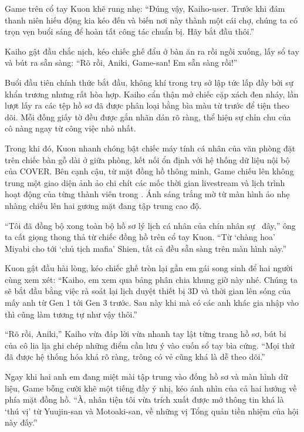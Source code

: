 \documentclass[../main.tex]{subfiles}
\begin{document}
Game trên cổ tay Kuon khẽ rung nhẹ:  ``Đúng vậy, Kaiho-user. Trước khi đám thanh niên hiếu động kia kéo đến và biến nơi này thành một cái chợ, chúng ta có trọn vẹn buổi sáng để hoàn tất công tác chuẩn bị. Hãy bắt đầu thôi.''

Kaiho gật đầu chắc nịch, kéo chiếc ghế đẩu ở bàn ăn ra rồi ngồi xuống, lấy sổ tay và bút ra sẵn sàng: ``Rõ rồi, Aniki, Game-san! Em sẵn sàng rồi!''

\ct

Buổi đầu tiên chính thức bắt đầu, không khí trong trụ sở lập tức lấp đầy bởi sự khẩn trương nhưng rất hòa hợp. Kaiho cẩn thận mở chiếc cặp xách đen nháy, lần lượt lấy ra các tệp hồ sơ đã được phân loại bằng bìa màu từ trước để tiện theo dõi. Mỗi đống giấy tờ đều được gắn nhãn dán rõ ràng, thể hiện sự chỉn chu của cô nàng ngay từ công việc nhỏ nhất.

Trong khi đó, Kuon nhanh chóng bật chiếc máy tính cá nhân của văn phòng đặt trên chiếc bàn gỗ dài ở giữa phòng, kết nối ổn định với hệ thống dữ liệu nội bộ của COVER. Bên cạnh cậu, từ mặt đồng hồ thông minh, Game chiếu lên không trung một giao diện ảnh ảo chi chít các mốc thời gian livestream và lịch trình hoạt động của từng thành viên trong \hls. Ánh sáng trắng mờ từ màn hình ảo nhẹ nhàng chiếu lên hai gương mặt đang tập trung cao độ.

``Tôi đã đồng bộ xong toàn bộ hồ sơ lý lịch cá nhân của chín nhân sự \hls\ đây,'' ông ta cất giọng thong thả từ chiếc đồng hồ trên cổ tay Kuon. ``Từ `chàng hoa' Miyabi cho tới `chủ tịch mafia' Shien, tất cả đều sẵn sàng trên màn hình này.''

Kuon gật đầu hài lòng, kéo chiếc ghế tròn lại gần em gái song sinh để hai người cùng xem xét: ``Kaiho, em xem qua bảng phân chia khung giờ này nhé. Chúng ta sẽ bắt đầu bằng việc rà soát lại lịch duyệt thiết bị 3D và thời gian lên sóng của mấy anh từ Gen 1 tới Gen 3 trước. Sau này khi mà có các anh khác gia nhập vào thì cũng làm tương tự như vậy thôi.''

``Rõ rồi, Aniki,'' Kaiho vừa đáp lời vừa nhanh tay lật từng trang hồ sơ, bút bi của cô lia lịa ghi chép những điểm cần lưu ý vào cuốn sổ tay bìa cứng. ``Mọi thứ đã được hệ thống hóa khá rõ ràng, trông có vẻ cũng khá là dễ theo dõi.''

Ngay khi hai anh em đang miệt mài tập trung vào đống hồ sơ và màn hình dữ liệu, Game bỗng cười khẽ một tiếng đầy ý nhị, kéo ánh nhìn của cả hai hướng về phía mặt đồng hồ. ``À, nhân tiện tôi vừa trích xuất được mớ thông tin khá là `thú vị' từ Yuujin-san và Motoaki-san, về những vị Tổng quản tiền nhiệm của hội này đấy.''
\end{document}
